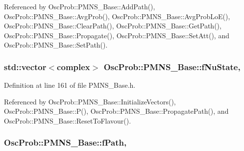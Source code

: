 Referenced by Osc\+Prob\+::\+P\+M\+N\+S\+\_\+\+Base\+::\+Add\+Path(), Osc\+Prob\+::\+P\+M\+N\+S\+\_\+\+Base\+::\+Avg\+Prob(), Osc\+Prob\+::\+P\+M\+N\+S\+\_\+\+Base\+::\+Avg\+Prob\+Lo\+E(), Osc\+Prob\+::\+P\+M\+N\+S\+\_\+\+Base\+::\+Clear\+Path(), Osc\+Prob\+::\+P\+M\+N\+S\+\_\+\+Base\+::\+Get\+Path(), Osc\+Prob\+::\+P\+M\+N\+S\+\_\+\+Base\+::\+Propagate(), Osc\+Prob\+::\+P\+M\+N\+S\+\_\+\+Base\+::\+Set\+Att(), and Osc\+Prob\+::\+P\+M\+N\+S\+\_\+\+Base\+::\+Set\+Path().

\subsubsection[{\texorpdfstring{f\+Nu\+State}{fNuState}}]{\setlength{\rightskip}{0pt plus 5cm}std\+::vector$<${\bf complex}$>$ Osc\+Prob\+::\+P\+M\+N\+S\+\_\+\+Base\+::f\+Nu\+State\hspace{0.3cm}{\ttfamily [protected]}, {\ttfamily [inherited]}}\hypertarget{classOscProb_1_1PMNS__Base_ad38a7107c3ab393591fd5ba21658300b}{}\label{classOscProb_1_1PMNS__Base_ad38a7107c3ab393591fd5ba21658300b}


Definition at line 161 of file P\+M\+N\+S\+\_\+\+Base.\+h.



Referenced by Osc\+Prob\+::\+P\+M\+N\+S\+\_\+\+Base\+::\+Initialize\+Vectors(), Osc\+Prob\+::\+P\+M\+N\+S\+\_\+\+Base\+::\+P(), Osc\+Prob\+::\+P\+M\+N\+S\+\_\+\+Base\+::\+Propagate\+Path(), and Osc\+Prob\+::\+P\+M\+N\+S\+\_\+\+Base\+::\+Reset\+To\+Flavour().

\subsubsection[{\texorpdfstring{f\+Path}{fPath}}]{ Osc\+Prob\+::\+P\+M\+N\+S\+\_\+\+Base\+::f\+Path\hspace{0.3cm}{\ttfamily [protected]}, {\ttfamily [inherited]}}\hypertarget{classOscProb_1_1PMNS__Base_a849437aa8891fe042e86886ce8f81c6e}{}\label{classOscProb_1_1PMNS__Base_a849437aa8891fe042e86886ce8f81c6e}


